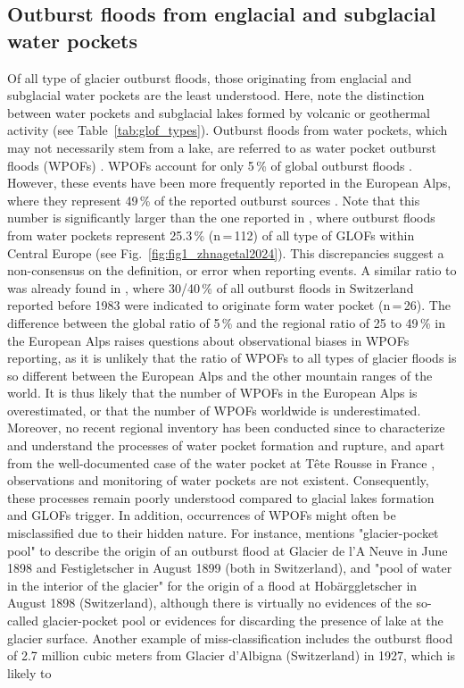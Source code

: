 \subsection{Outburst floods from englacial and subglacial water pockets} 
\label{subsection:glofs_water_pockets}

Of all type of glacier outburst floods, those originating from englacial and subglacial water pockets are the least understood. Here, note the distinction between water pockets and subglacial lakes formed by volcanic or geothermal activity (see Table~\ref{tab:glof_types}). Outburst floods from water pockets, which may not necessarily stem from a lake, are referred to as water pocket outburst floods (WPOFs) \citep[e.g. WPOFs is used in][instead of GLOFs]{Deline&al2004}. WPOFs account for only 5\,\% of global outburst floods \cite{Lutzow&al2023}. However, these events have been more frequently reported in the European Alps, where they represent 49\,\% of the reported outburst sources \citep{Lutzow&al2023}. Note that this number is significantly larger than the one reported in \cite{Zhang&al2024}, where outburst floods from water pockets represent 25.3\,\% (n\,=\,112) of all type of GLOFs within Central Europe (see Fig.~\ref{fig:fig1_zhnagetal2024}). This discrepancies suggest a non-consensus on the definition, or error when reporting events. A similar ratio to \cite{Lutzow&al2023} was already found in \cite{Haeberli1983}, where 30/40\,\% of all outburst floods in Switzerland reported before 1983 were indicated to originate form water pocket (n\,=\,26). The difference between the global ratio of 5\,\% and the regional ratio of 25 to 49\,\% in the European Alps raises questions about observational biases in WPOFs reporting, as it is unlikely that the ratio of WPOFs to all types of glacier floods is so different between the European Alps and the other mountain ranges of the world. It is thus likely that the number of WPOFs in the European Alps is overestimated, or that the number of WPOFs worldwide is underestimated. Moreover, no recent regional inventory has been conducted since \cite{Haeberli1983} to characterize and understand the processes of water pocket formation and rupture, and apart from the well-documented case of the water pocket at Tête Rousse in France \citep{Vincent&al2010b,Vincent&al2012}, observations and monitoring of water pockets are not existent. Consequently, these processes remain poorly understood compared to glacial lakes formation and GLOFs trigger. In addition, occurrences of WPOFs might often be misclassified due to their hidden nature. For instance, \cite{Rabot1905} mentions "glacier-pocket pool" to describe the origin of an outburst flood at Glacier de l'A Neuve in June 1898 and Festigletscher in August 1899 (both in Switzerland), and "pool of water in the interior of the glacier" for the origin of a flood at Hobärggletscher in August 1898 (Switzerland), although there is virtually no evidences of the so-called glacier-pocket pool or evidences for discarding the presence of lake at the glacier surface. Another example of miss-classification includes the outburst flood of 2.7 million cubic meters from Glacier d'Albigna (Switzerland) in 1927, which is likely to 